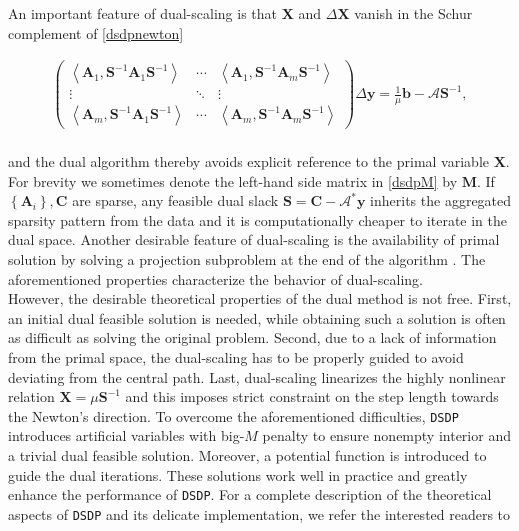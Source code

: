 An important feature of dual-scaling is that $\mathbf{X}$ and $\Delta \mathbf{X}$
vanish in the Schur complement of \eqref{dsdpnewton}

\begin{eqnarray} \label{dsdpM}
	\left(\begin{array}{ccc}
     \left\langle \mathbf{A}_1, \mathbf{S}^{- 1} \mathbf{A}_1 \mathbf{S}^{- 1} \right\rangle & \cdots &
     \left\langle \mathbf{A}_1, \mathbf{S}^{- 1} \mathbf{A}_m \mathbf{S}^{- 1} \right\rangle\\
     \vdots & \ddots & \vdots\\
     \left\langle \mathbf{A}_m, \mathbf{S}^{- 1} \mathbf{A}_1 \mathbf{S}^{- 1} \right\rangle & \cdots &
     \left\langle \mathbf{A}_m, \mathbf{S}^{- 1} \mathbf{A}_m \mathbf{S}^{- 1} \right\rangle
   \end{array}\right) \Delta \mathbf{y} = \frac{1}{\mu} \mathbf{b} - \mathcal{A} \mathbf{S}^{- 1},
\end{eqnarray}\\
and the dual algorithm thereby avoids explicit reference to the primal
variable $\mathbf{X}$. For brevity we sometimes denote the left-hand side matrix in \eqref{dsdpM} by $\mathbf{M}$.
If $\left\{ \mathbf{A}_i \right\}, \mathbf{C}$ are sparse, any feasible dual slack $\mathbf{S} = \mathbf{C}
-\mathcal{A}^{\ast} \mathbf{y}$ inherits the aggregated sparsity pattern from the data and it is
computationally cheaper to iterate in the dual space.
Another desirable feature of dual-scaling is the availability of primal
solution by solving a projection subproblem at the end of the algorithm \cite{benson2008algorithm}. The
aforementioned properties characterize the behavior of dual-scaling.\\

However, the desirable theoretical properties of the dual method is not free.  First, an initial dual feasible solution is needed, while obtaining such a
solution is often as difficult as solving the original problem. Second, due to
a lack of information from the primal space, the dual-scaling has to be properly guided to avoid deviating from the central path. Last,
dual-scaling linearizes the highly nonlinear relation $\mathbf{X} = \mu \mathbf{S}^{- 1}$ and
this imposes strict constraint on the step length towards the Newton's direction. To overcome the aforementioned difficulties, {{\texttt{DSDP}}}
introduces artificial variables with big-$M$ penalty to ensure nonempty interior and a trivial dual feasible solution. Moreover, a potential function is introduced 
to guide the dual iterations. These solutions work well in practice and greatly enhance the performance of {{\texttt{DSDP}}}. For a complete description of the theoretical aspects of {{\texttt{DSDP}}} and
its delicate implementation, we refer the interested readers to
{\cite{benson2000solving, benson2008algorithm}}\\

